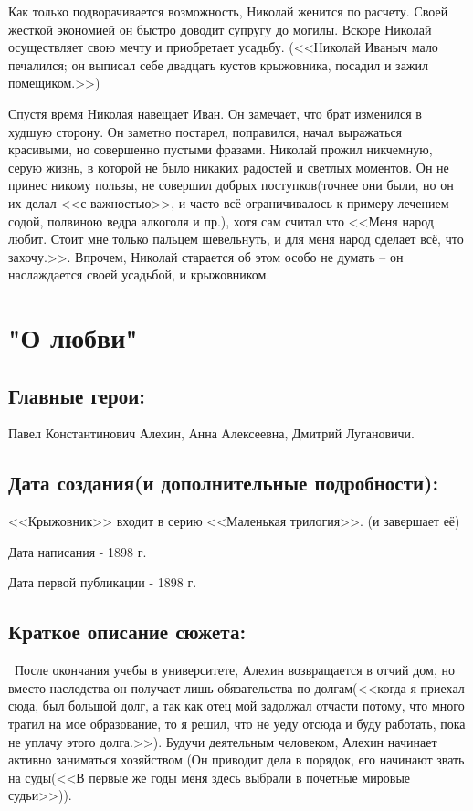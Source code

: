 \documentclass[a4paper,12pt]{article}
\begin{document}
	Как только подворачивается возможность, Николай женится по расчету. Своей жесткой экономией он быстро доводит супругу до могилы. Вскоре Николай осуществляет свою мечту и приобретает усадьбу. (<<Николай Иваныч мало печалился; он выписал себе двадцать кустов крыжовника, посадил и зажил помещиком.>>)
	
	Спустя время Николая навещает Иван. Он замечает, что брат изменился в худшую сторону. Он заметно постарел, поправился, начал выражаться красивыми, но совершенно пустыми фразами. Николай прожил никчемную, серую жизнь, в которой не было никаких радостей и светлых моментов. Он не принес никому пользы, не совершил добрых поступков(точнее они были, но он их делал <<с важностью>>, и часто всё ограничивалось к примеру лечением содой, полвиною ведра алкоголя и пр.), хотя сам считал что <<Меня народ любит. Стоит мне только пальцем шевельнуть, и для меня народ сделает всё, что захочу.>>. Впрочем, Николай старается об этом особо не думать – он наслаждается своей усадьбой, и крыжовником.
	
	\section{"О любви"}
	\subsection{Главные герои: }
	Павел Константинович Алехин, Анна Алексеевна, Дмитрий Лугановичи.
	\subsection{Дата создания(и дополнительные подробности): }
	<<Крыжовник>> входит в серию <<Маленькая трилогия>>. (и завершает её)
	
	\noindent
	Дата написания - 1898 г.
	
	\noindent
	Дата первой публикации - 1898 г.
	
	\subsection{Краткое описание сюжета: }
	\quad \, После окончания учебы в университете, Алехин возвращается в отчий дом, но вместо наследства он получает лишь обязательства по долгам(<<когда я приехал сюда, был большой долг, а так как отец мой задолжал отчасти потому, что много тратил на мое образование, то я решил, что не уеду отсюда и буду работать, пока не уплачу этого долга.>>). Будучи деятельным человеком, Алехин начинает активно заниматься хозяйством (Он приводит дела в порядок, его начинают звать на суды(<<В первые же годы меня здесь выбрали в почетные мировые судьи>>)).
	
\end{document}
